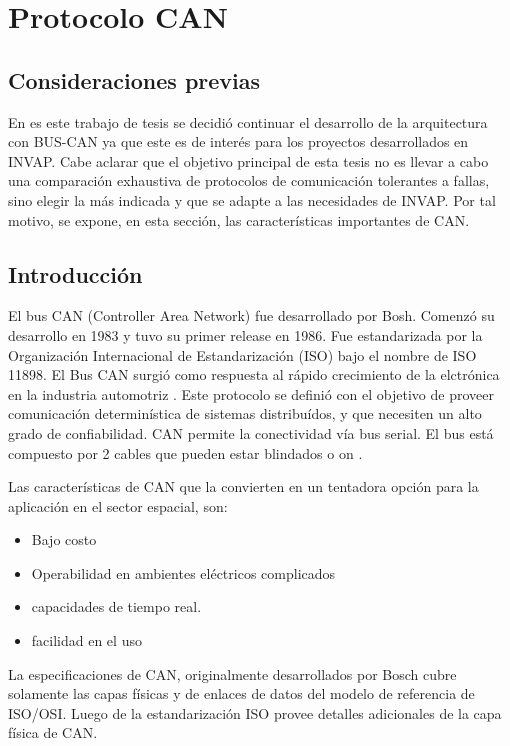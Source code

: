 \section{Protocolo CAN} \label{seccion:ProtocoloCAN}
\subsection{Consideraciones previas}
En es este trabajo de tesis se decidió continuar el desarrollo de la arquitectura con BUS-CAN ya que este es de interés para los proyectos desarrollados en INVAP. Cabe aclarar que el objetivo principal de esta tesis no es llevar a cabo una comparación exhaustiva de protocolos de comunicación tolerantes a fallas, sino elegir la más indicada y que se adapte a las necesidades de INVAP. Por tal motivo, se expone, en esta sección, las características importantes de CAN.

\subsection{Introducción}
El bus CAN (Controller Area Network) fue desarrollado por Bosh. Comenzó su desarrollo en 1983 y tuvo su primer release en 1986. Fue estandarizada por la Organización Internacional de Estandarización (ISO) bajo el nombre de  ISO 11898. El Bus CAN surgió como respuesta al rápido crecimiento de la elctrónica en la industria automotriz \citep{esdWEB}. Este protocolo se definió con el objetivo de proveer comunicación determinística de sistemas distribuídos, y que necesiten un alto grado de confiabilidad. CAN permite la conectividad vía bus serial. El bus está compuesto por  2 cables que pueden estar blindados o on \citep{esdWEB}.

Las características de CAN que la convierten en un tentadora opción para la aplicación en el sector espacial, son:
\begin{itemize}
  \item Bajo costo
  \item Operabilidad en ambientes eléctricos complicados
  \item capacidades de tiempo real.
  \item facilidad en el uso
\end{itemize}

La especificaciones de CAN, originalmente desarrollados por Bosch cubre solamente las capas físicas y de enlaces de datos del modelo de referencia de ISO/OSI. Luego de la estandarización ISO provee detalles adicionales de la capa física de CAN.

